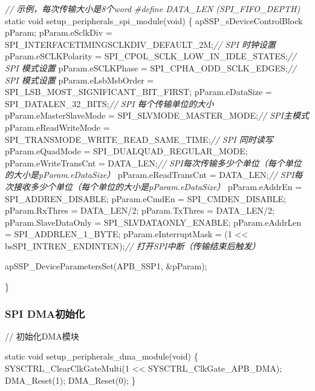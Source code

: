 \documentclass[
  12pt,
]{book}
\newenvironment{Shaded}{\begin{snugshade}}{\end{snugshade}}
\newcommand{\CommentTok}[1]{\textcolor[rgb]{0.56,0.35,0.01}{\textit{#1}}}
\newcommand{\DataTypeTok}[1]{\textcolor[rgb]{0.13,0.29,0.53}{#1}}
\newcommand{\DecValTok}[1]{\textcolor[rgb]{0.00,0.00,0.81}{#1}}
\newcommand{\NormalTok}[1]{#1}
\newcommand{\PreprocessorTok}[1]{\textcolor[rgb]{0.56,0.35,0.01}{\textit{#1}}}
\begin{document}
\begin{Shaded}
\begin{Highlighting}[]
\CommentTok{// 示例，每次传输大小是8个word}
\PreprocessorTok{#define DATA_LEN (SPI_FIFO_DEPTH)}
\DataTypeTok{static} \DataTypeTok{void}\NormalTok{ setup_peripherals_spi_module(}\DataTypeTok{void}\NormalTok{)}
\NormalTok{\{}
\NormalTok{    apSSP_sDeviceControlBlock pParam;}
\NormalTok{    pParam.eSclkDiv = SPI_INTERFACETIMINGSCLKDIV_DEFAULT_2M;}\CommentTok{// SPI 时钟设置}
\NormalTok{    pParam.eSCLKPolarity = SPI_CPOL_SCLK_LOW_IN_IDLE_STATES;}\CommentTok{// SPI 模式设置}
\NormalTok{    pParam.eSCLKPhase = SPI_CPHA_ODD_SCLK_EDGES;}\CommentTok{// SPI 模式设置}
\NormalTok{    pParam.eLsbMsbOrder = SPI_LSB_MOST_SIGNIFICANT_BIT_FIRST;}
\NormalTok{    pParam.eDataSize = SPI_DATALEN_32_BITS;}\CommentTok{// SPI 每个传输单位的大小}
\NormalTok{    pParam.eMasterSlaveMode = SPI_SLVMODE_MASTER_MODE;}\CommentTok{// SPI主模式}
\NormalTok{    pParam.eReadWriteMode = SPI_TRANSMODE_WRITE_READ_SAME_TIME;}\CommentTok{// SPI 同时读写}
\NormalTok{    pParam.eQuadMode = SPI_DUALQUAD_REGULAR_MODE;}
\NormalTok{    pParam.eWriteTransCnt = DATA_LEN;}\CommentTok{// SPI每次传输多少个单位（每个单位的大小是pParam.eDataSize）}
\NormalTok{    pParam.eReadTransCnt = DATA_LEN;}\CommentTok{// SPI每次接收多少个单位（每个单位的大小是pParam.eDataSize）}
\NormalTok{    pParam.eAddrEn = SPI_ADDREN_DISABLE;}
\NormalTok{    pParam.eCmdEn = SPI_CMDEN_DISABLE;}
\NormalTok{    pParam.RxThres = DATA_LEN/}\DecValTok{2}\NormalTok{;}
\NormalTok{    pParam.TxThres = DATA_LEN/}\DecValTok{2}\NormalTok{;}
\NormalTok{    pParam.SlaveDataOnly = SPI_SLVDATAONLY_ENABLE;}
\NormalTok{    pParam.eAddrLen = SPI_ADDRLEN_1_BYTE;}
\NormalTok{    pParam.eInterruptMask = (}\DecValTok{1}\NormalTok{ << bsSPI_INTREN_ENDINTEN);}\CommentTok{// 打开SPI中断（传输结束后触发）}
  
\NormalTok{    apSSP_DeviceParametersSet(APB_SSP1, &pParam);}
    
\NormalTok{\}}
\end{Highlighting}
\end{Shaded}

\hypertarget{spi-dmaux521dux59cbux5316-2}{%
\subsubsection{SPI DMA初始化}\label{spi-dmaux521dux59cbux5316-2}}

// 初始化DMA模块

\begin{Shaded}
\begin{Highlighting}[]
\DataTypeTok{static} \DataTypeTok{void}\NormalTok{ setup_peripherals_dma_module(}\DataTypeTok{void}\NormalTok{)}
\NormalTok{\{}
\NormalTok{    SYSCTRL_ClearClkGateMulti(}\DecValTok{1}\NormalTok{ << SYSCTRL_ClkGate_APB_DMA);}
\NormalTok{    DMA_Reset(}\DecValTok{1}\NormalTok{);}
\NormalTok{    DMA_Reset(}\DecValTok{0}\NormalTok{);}
\NormalTok{\}}
\end{Highlighting}
\end{Shaded}
\end{document}
